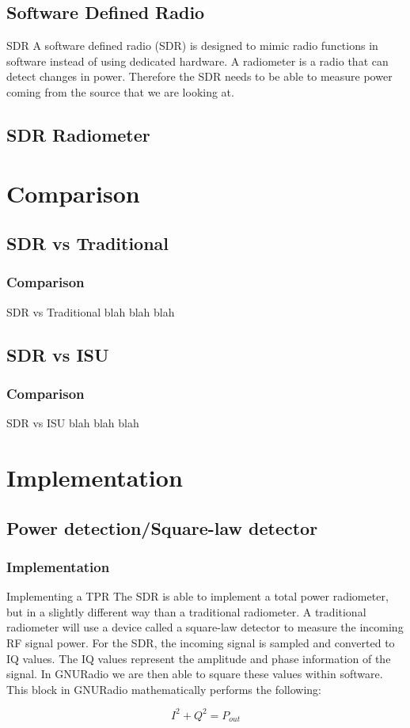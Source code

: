 \documentclass{beamer}
\begin{document}
\subsection{Software Defined Radio}
\begin{frame}
\begin{block}{SDR}
A software defined radio (SDR) is designed to mimic radio functions in software instead of using dedicated hardware.  A radiometer is a radio that can detect changes in power.  Therefore the SDR needs to be able to measure power coming from the source that we are looking at. 
\end{block}
\end{frame}
\subsection{SDR Radiometer}
\section{Comparison}
\subsection{SDR vs Traditional}
\begin{frame}
\frametitle{Comparison}
\begin{block}{SDR vs Traditional}
blah blah blah
\end{block}
\end{frame}
\subsection{SDR vs ISU}
\begin{frame}
\frametitle{Comparison}
\begin{block}{SDR vs ISU}
blah blah blah
\end{block}
\end{frame}
\section{Implementation}
\subsection{Power detection/Square-law detector}
\begin{frame}
\frametitle{Implementation}
\begin{block}{Implementing a TPR}
The SDR is able to implement a total power radiometer, but in a slightly different way than a traditional radiometer.  A traditional radiometer will use a device called a square-law detector to measure the incoming RF signal power.  For the SDR, the incoming signal is sampled and converted to IQ values.  The IQ values represent the amplitude and phase information of the signal.  In GNURadio we are then able to square these values within software.  This block in GNURadio mathematically performs the following:

\begin{equation}\label{sumIQ}
I^2+Q^2 = P_{out}
\end{equation}
\end{block}
\end{frame}
\end{document}
